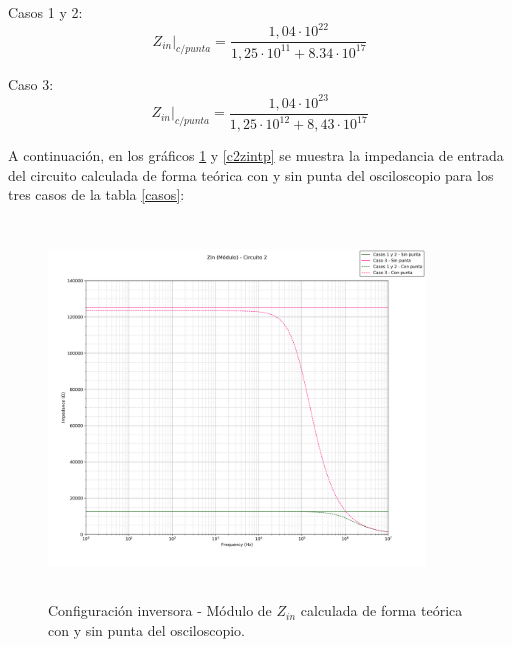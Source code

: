 Casos 1 y 2:
\begin{equation}
	Z_{in}\rvert_{c/punta} = \frac{1,04 \cdot 10^22}{1,25 \cdot 10^11 + 8.34 \cdot 10^17}
	\label{c2c1zinp}
\end{equation}

Caso 3:
\begin{equation}
	Z_{in}\rvert_{c/punta} = \frac{1,04 \cdot 10^23}{1,25 \cdot 10^12 + 8,43 \cdot 10^17}
	\label{c2c3zinp}
\end{equation}


A continuaci\'on, en los gr\'aficos \ref{c2zintm} y \ref{c2zintp} se muestra la impedancia de entrada del circuito calculada de forma te\'orica con y sin punta del osciloscopio para los tres casos de la tabla \ref{casos}:

\begin{figure}[H] %
	\centering
	\includegraphics[width=10cm,height=10cm,keepaspectratio]{../EJ1/00GRAFICOS/teoricos/circ2zinm.png}
	\caption{Configuración inversora - M\'odulo de $Z_{in}$ calculada de forma te\'orica con y sin punta del osciloscopio.}
	\label{c2zintm}
\end{figure}

